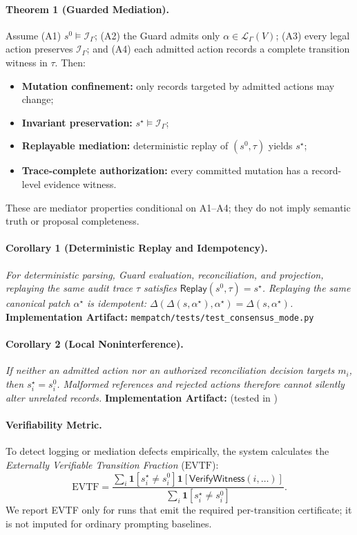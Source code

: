 \paragraph{Theorem 1 (Guarded Mediation).}\label{thm:certified_transparent_mediation}
Assume (A1) $s^0\models\mathcal I_\Gamma$; (A2) the Guard admits only $\alpha\in\mathcal L_\Gamma(V)$; (A3) every legal action preserves $\mathcal I_\Gamma$; and (A4) each admitted action records a complete transition witness in $\tau$. Then:
\begin{itemize}
    \item \textbf{Mutation confinement:} only records targeted by admitted actions may change;
    \item \textbf{Invariant preservation:} $s^\star\models\mathcal I_\Gamma$;
    \item \textbf{Replayable mediation:} deterministic replay of $(s^0,\tau)$ yields $s^\star$;
    \item \textbf{Trace-complete authorization:} every committed mutation has a record-level evidence witness.
\end{itemize}
These are mediator properties conditional on A1--A4; they do not imply semantic truth or proposal completeness.

\paragraph{Corollary 1 (Deterministic Replay and Idempotency).}\label{prop:deterministic_replay}
\emph{For deterministic parsing, Guard evaluation, reconciliation, and projection, replaying the same audit trace $\tau$ satisfies $\mathsf{Replay}(s^0, \tau) = s^\star$. Replaying the same canonical patch $\alpha^\star$ is idempotent: $\Delta(\Delta(s, \alpha^\star), \alpha^\star) = \Delta(s, \alpha^\star)$.}
\textbf{Implementation Artifact:} \texttt{mempatch/tests/test\_consensus\_mode.py}

\paragraph{Corollary 2 (Local Noninterference).}\label{prop:local_noninterference}
\emph{If neither an admitted action nor an authorized reconciliation decision targets $m_i$, then $s_i^\star = s_i^0$. Malformed references and rejected actions therefore cannot silently alter unrelated records.}
\textbf{Implementation Artifact:}  (tested in )

\paragraph{Verifiability Metric.}
To detect logging or mediation defects empirically, the system calculates the \emph{Externally Verifiable Transition Fraction} ($\mathrm{EVTF}$):
\begin{equation}
\mathrm{EVTF} = \frac{\sum_i \mathbf{1}[s_i^\star \neq s_i^0] \mathbf{1}[\mathsf{VerifyWitness}(i, \dots)]}{\sum_i \mathbf{1}[s_i^\star \neq s_i^0]}.
\end{equation}
We report EVTF only for runs that emit the required per-transition certificate; it is not imputed for ordinary prompting baselines.
